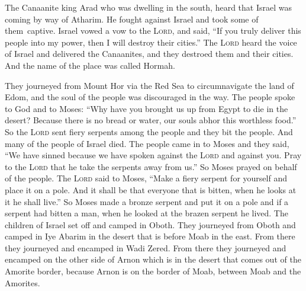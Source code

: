 
\begin{inparaenum}
     The Canaanite king Arad who was dwelling in the south, heard that Israel was coming by way of Atharim. He fought against Israel and took some of them\understood\ captive.%
     Israel vowed a vow to the \textsc{Lord}, and said, ``If you truly deliver this people into my power, then I will destroy their cities.''%
     The \textsc{Lord} heard the voice of Israel and delivered the Canaanites, and they destroed them and their cities. And the name of the place was called Hormah.%
    
     They journeyed from Mount Hor via the Red Sea to circumnavigate the land of Edom, and the soul of the people was discouraged in the way.%
     The people spoke to God and to Moses: ``Why have you brought us up from Egypt to die in the desert? Because there is no bread or water, our souls abhor this worthless food.''%
     So the \textsc{Lord} sent fiery serpents among the people and they bit the people. And many of the people of Israel died.%
     The people came in to Moses and they said, ``We have sinned because we have spoken against the \textsc{Lord} and against you. Pray to the \textsc{Lord} that he take the serpents away from us.'' So Moses prayed on behalf of the people.%
     The \textsc{Lord} said to Moses, ``Make a fiery serpent for yourself and place it on a pole. And it shall be that everyone that is bitten, when he looks at it he shall live.''%
     So Moses made a bronze serpent and put it on a pole and if a serpent had bitten a man, when he looked at the brazen serpent he lived.%
     The children of Israel set off and camped in Oboth.%
     They journeyed from Oboth and camped in Iye Abarim in the desert that is before Moab in the east.%
     From there they journeyed and encamped in Wadi Zered.%
     From there they journeyed and encamped on the other side of Arnon which is in the desert that comes out of the Amorite border, because Arnon is on the border of Moab, between Moab and the Amorites.%
    

\end{inparaenum}
